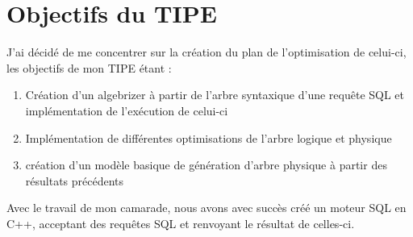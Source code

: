 \documentclass[12pt,a4paper]{article}
\begin{document}
\section*{Objectifs du TIPE}
J'ai décidé de me concentrer sur la création du plan de l'optimisation de celui-ci, les objectifs de mon TIPE étant : 
\begin{enumerate}
    \item Création d'un algebrizer à partir de l'arbre syntaxique d'une requête SQL et implémentation de l'exécution de celui-ci
    \item Implémentation de différentes optimisations de l'arbre logique et physique
    \item création d'un modèle basique de génération d'arbre physique à partir des résultats précédents
\end{enumerate}
Avec le travail de mon camarade, nous avons avec succès créé un moteur SQL en C++, acceptant des requêtes SQL et renvoyant le résultat de celles-ci.

\printbibliography
\end{document}
